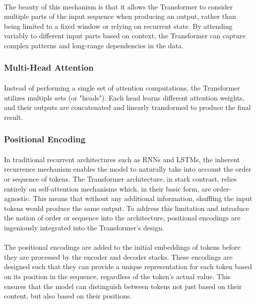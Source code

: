             \paragraph{}The beauty of this mechanism is that it allows the Transformer to consider multiple parts of the input sequence when producing an output, rather than being limited to a fixed window or relying on recurrent state. By attending variably to different input parts based on context, the Transformer can capture complex patterns and long-range dependencies in the data.
        
        
        \subsubsection{Multi-Head Attention}
        
            \paragraph{}Instead of performing a single set of attention computations, the Transformer utilizes multiple sets (or "heads"). Each head learns different attention weights, and their outputs are concatenated and linearly transformed to produce the final result.
        
        \subsubsection{Positional Encoding}

            \paragraph{}In traditional recurrent architectures such as RNNs and LSTMs, the inherent recurrence mechanism enables the model to naturally take into account the order or sequence of tokens. The Transformer architecture, in stark contrast, relies entirely on self-attention mechanisms which, in their basic form, are order-agnostic. This means that without any additional information, shuffling the input tokens would produce the same output. To address this limitation and introduce the notion of order or sequence into the architecture, positional encodings are ingeniously integrated into the Transformer's design.
            
            \paragraph{}The positional encodings are added to the initial embeddings of tokens before they are processed by the encoder and decoder stacks. These encodings are designed such that they can provide a unique representation for each token based on its position in the sequence, regardless of the token's actual value. This ensures that the model can distinguish between tokens not just based on their content, but also based on their positions.
        

